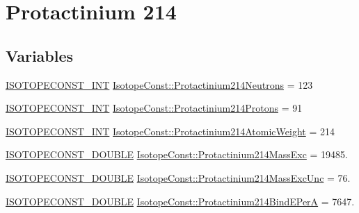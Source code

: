 \hypertarget{group___isotope_const-_protactinium-_pa214}{}\section{Protactinium 214}
\label{group___isotope_const-_protactinium-_pa214}
\subsection*{Variables}
\begin{DoxyCompactItemize}
\item 
\mbox{\hyperlink{group___isotope_const-_macros_ga5f18360b3e99483a35c32d789e62621c}{I\+S\+O\+T\+O\+P\+E\+C\+O\+N\+S\+T\+\_\+\+I\+NT}} \mbox{\hyperlink{group___isotope_const-_protactinium-_pa214_ga807eb1db23291b6d80203c8ba96eed56}{Isotope\+Const\+::\+Protactinium214\+Neutrons}} = 123
\item 
\mbox{\hyperlink{group___isotope_const-_macros_ga5f18360b3e99483a35c32d789e62621c}{I\+S\+O\+T\+O\+P\+E\+C\+O\+N\+S\+T\+\_\+\+I\+NT}} \mbox{\hyperlink{group___isotope_const-_protactinium-_pa214_ga96f2633872d10b87d6f8537b4f7dcf81}{Isotope\+Const\+::\+Protactinium214\+Protons}} = 91
\item 
\mbox{\hyperlink{group___isotope_const-_macros_ga5f18360b3e99483a35c32d789e62621c}{I\+S\+O\+T\+O\+P\+E\+C\+O\+N\+S\+T\+\_\+\+I\+NT}} \mbox{\hyperlink{group___isotope_const-_protactinium-_pa214_gac8175b412cda129aef4f0b36415b22b2}{Isotope\+Const\+::\+Protactinium214\+Atomic\+Weight}} = 214
\item 
\mbox{\hyperlink{group___isotope_const-_macros_ga8f45a7272ce02c0b4c65c44636ed719a}{I\+S\+O\+T\+O\+P\+E\+C\+O\+N\+S\+T\+\_\+\+D\+O\+U\+B\+LE}} \mbox{\hyperlink{group___isotope_const-_protactinium-_pa214_gac3ba9ec09e8b28bfad57333ec9cff974}{Isotope\+Const\+::\+Protactinium214\+Mass\+Exc}} = 19485.
\item 
\mbox{\hyperlink{group___isotope_const-_macros_ga8f45a7272ce02c0b4c65c44636ed719a}{I\+S\+O\+T\+O\+P\+E\+C\+O\+N\+S\+T\+\_\+\+D\+O\+U\+B\+LE}} \mbox{\hyperlink{group___isotope_const-_protactinium-_pa214_ga26af96fa667fbd55e543cdcfc4486168}{Isotope\+Const\+::\+Protactinium214\+Mass\+Exc\+Unc}} = 76.
\item 
\mbox{\hyperlink{group___isotope_const-_macros_ga8f45a7272ce02c0b4c65c44636ed719a}{I\+S\+O\+T\+O\+P\+E\+C\+O\+N\+S\+T\+\_\+\+D\+O\+U\+B\+LE}} \mbox{\hyperlink{group___isotope_const-_protactinium-_pa214_ga03e649d8f1a9b422376a1abfe173baa4}{Isotope\+Const\+::\+Protactinium214\+Bind\+E\+PerA}} = 7647.

\end{DoxyCompactItemize}
